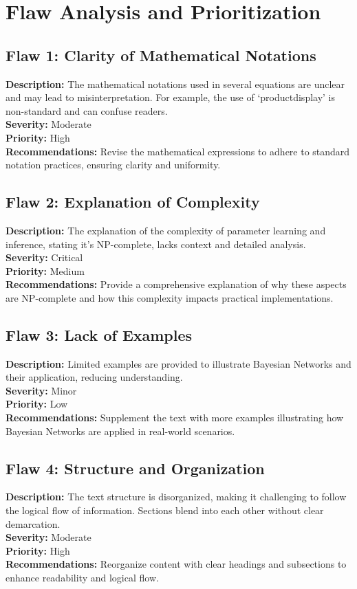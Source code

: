 \documentclass{article}
\begin{document}
\section*{Flaw Analysis and Prioritization}

\subsection*{Flaw 1: Clarity of Mathematical Notations}
\textbf{Description:} The mathematical notations used in several equations are unclear and may lead to misinterpretation. For example, the use of `productdisplay' is non-standard and can confuse readers. \\
\textbf{Severity:} Moderate \\
\textbf{Priority:} High \\
\textbf{Recommendations:} Revise the mathematical expressions to adhere to standard notation practices, ensuring clarity and uniformity.

\subsection*{Flaw 2: Explanation of Complexity}
\textbf{Description:} The explanation of the complexity of parameter learning and inference, stating it's NP-complete, lacks context and detailed analysis. \\
\textbf{Severity:} Critical \\
\textbf{Priority:} Medium \\
\textbf{Recommendations:} Provide a comprehensive explanation of why these aspects are NP-complete and how this complexity impacts practical implementations.

\subsection*{Flaw 3: Lack of Examples}
\textbf{Description:} Limited examples are provided to illustrate Bayesian Networks and their application, reducing understanding. \\
\textbf{Severity:} Minor \\
\textbf{Priority:} Low \\
\textbf{Recommendations:} Supplement the text with more examples illustrating how Bayesian Networks are applied in real-world scenarios.

\subsection*{Flaw 4: Structure and Organization}
\textbf{Description:} The text structure is disorganized, making it challenging to follow the logical flow of information. Sections blend into each other without clear demarcation. \\
\textbf{Severity:} Moderate \\
\textbf{Priority:} High \\
\textbf{Recommendations:} Reorganize content with clear headings and subsections to enhance readability and logical flow.
\end{document}
